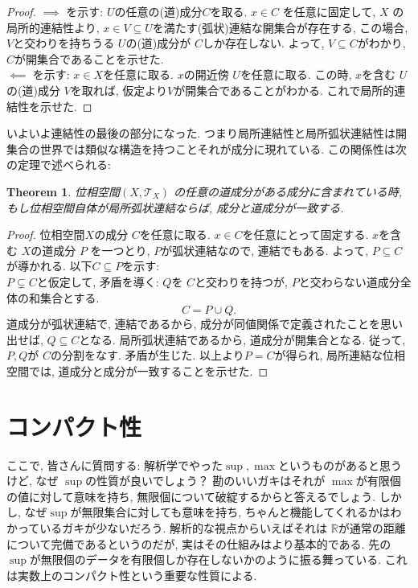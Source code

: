 \documentclass[dvipdfmx]{jbook}
\newtheorem{theorem}{Theorem}[section]
\theoremstyle{remark}
\theoremstyle{plain}
\begin{document}
\begin{proof}
	$\implies$ を示す:
	$U$の任意の(道)成分$C$を取る. $x \in C$ を任意に固定して, 
	$X$ の局所的連結性より, $x \in V \subseteq U$を満たす(弧状)連結な開集合が存在する, 
	この場合, $V$と交わりを持ちうる $U$の(道)成分が $C$しか存在しない. 
	よって,  $V \subseteq C$がわかり, $C$が開集合であることを示せた.\\
	$ \impliedby$ を示す: 
	 $x \in  X$を任意に取る. $x$の開近傍 $U$を任意に取る.
	 この時, $x$を含む $U$の(道)成分 $V$を取れば,
	 仮定より$V$が開集合であることがわかる. これで局所的連結性を示せた.
\end{proof}

いよいよ連結性の最後の部分になった. つまり局所連結性と局所弧状連結性は開集合の世界では類似な構造を持つことそれが成分に現れている. この関係性は次の定理で述べられる: 

\begin{theorem}
	位相空間$\left( X , \mathcal{T}_{X} \right)$ の任意の道成分がある成分に含まれている時, 
	もし位相空間自体が局所弧状連結ならば, 成分と道成分が一致する.
\end{theorem}

\begin{proof}
	位相空間$X$の成分 $C$を任意に取る. 
	$x \in C $を任意にとって固定する. 
	$x$を含む $X$の道成分 $P$ を一つとり, $P$が弧状連結なので, 連結でもある.
	よって,  $P \subseteq C$が導かれる. 以下$C \subseteq P$を示す: \\
	$P \subsetneq C $と仮定して, 矛盾を導く:
	$Q$を $C$と交わりを持つが,  $P$と交わらない道成分全体の和集合とする. 
	 \[
	C=P \cup Q
	.\]
	道成分が弧状連結で, 連結であるから, 成分が同値関係で定義されたことを思い出せば, $Q\subseteq C$となる.
	局所弧状連結であるから, 道成分が開集合となる. 従って,  $P,Q$が $C$の分割をなす. 矛盾が生じた.
	以上より$P=C$が得られ, 局所連結な位相空間では, 道成分と成分が一致することを示せた. 
\end{proof}

\section{コンパクト性}

ここで, 皆さんに質問する: 解析学でやった$\sup , \max$というものがあると思うけど, なぜ $\sup$の性質が良いでしょう？
勘のいいガキはそれが $\max$が有限個の値に対して意味を持ち, 無限個について破綻するからと答えるでしょう.
しかし, なぜ$\sup$が無限集合に対しても意味を持ち, ちゃんと機能してくれるかはわかっているガキが少ないだろう.
解析的な視点からいえばそれは $\mathbb{R}$が通常の距離について完備であるというのだが, 実はその仕組みはより基本的である.
先の$\sup$が無限個のデータを有限個しか存在しないかのように振る舞っている. これは実数上のコンパクト性という重要な性質による.
\end{document}
